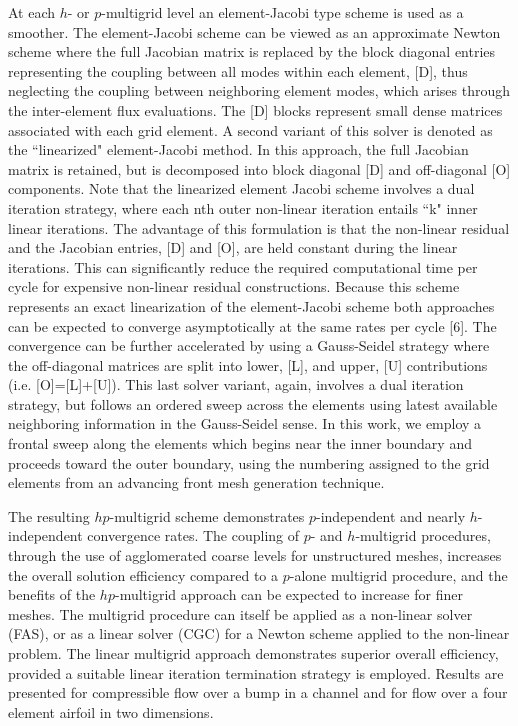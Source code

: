 \documentclass{report}
\begin{document}
At each $h$- or $p$-multigrid level an element-Jacobi type scheme is used
as a smoother. The element-Jacobi scheme can be viewed as an
approximate Newton scheme where the full Jacobian matrix is replaced by
the block diagonal entries representing the coupling between all modes
within each element, [D], thus neglecting the coupling between
neighboring element modes, which arises through the inter-element flux
evaluations. The [D] blocks represent small dense matrices associated
with each grid element. A second variant of this solver is denoted as
the ``linearized" element-Jacobi method. In this approach, the full
Jacobian matrix is retained, but is decomposed into block diagonal [D]
and off-diagonal [O] components. Note that the linearized element
Jacobi scheme involves a dual iteration strategy, where each nth outer
non-linear iteration entails ``k" inner linear iterations. The
advantage of this formulation is that the non-linear residual and the
Jacobian entries, [D] and [O], are held constant during the linear
iterations. This can significantly reduce the required computational
time per cycle for expensive non-linear residual constructions. Because
this scheme represents an exact linearization of the element-Jacobi
scheme both approaches can be expected to converge asymptotically at
the same rates per cycle [6]. The convergence can be further
accelerated by using a Gauss-Seidel strategy where the off-diagonal
matrices are split into lower, [L], and upper, [U] contributions (i.e.
[O]=[L]+[U]). This last solver variant, again, involves a dual
iteration strategy, but follows an ordered sweep across the elements
using latest available neighboring information in the Gauss-Seidel
sense. In this work, we employ a frontal sweep along the elements which
begins near the inner boundary and proceeds toward the outer boundary,
using the numbering assigned to the grid elements from an advancing
front mesh generation technique.

The resulting $hp$-multigrid scheme demonstrates $p$-independent and nearly
$h$-independent convergence rates. The coupling of $p$- and $h$-multigrid
procedures, through the use of agglomerated coarse levels for
unstructured meshes, increases the overall solution efficiency compared
to a $p$-alone multigrid procedure, and the benefits of the $hp$-multigrid
approach can be expected to increase for finer meshes. The multigrid
procedure can itself be applied as a non-linear solver (FAS), or as a
linear solver (CGC) for a Newton scheme applied to the non-linear
problem. The linear multigrid approach demonstrates superior overall
efficiency, provided a suitable linear iteration termination strategy
is employed. Results are presented for compressible flow over a bump in
a channel and for flow over a four element airfoil in two dimensions.
\end{document}
